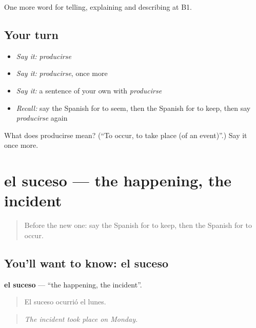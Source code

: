 \begin{grammarlens}[title={What you've built}]
One more word for telling, explaining and describing at B1.
\end{grammarlens}

\subsection*{Your turn}
\begin{itemize}
\raggedright
  \item \emph{Say it:} \emph{producirse}
  \item \emph{Say it:} \emph{producirse}, once more
  \item \emph{Say it:} a sentence of your own with \emph{producirse}
  \item \emph{Recall:} say the Spanish for to seem, then the Spanish for to keep, then say \emph{producirse} again
\end{itemize}

\begin{tcolorbox}[breakable,colback=teal!4,colframe=teal!35!black,title={Before you move on}]
What does producirse mean? (\textquotedblleft{}To occur, to take place (of an event)\textquotedblright{}.) Say it once more.
\end{tcolorbox}
\section[el suceso]{el suceso — the happening, the incident}

\label{lesson:ES-C512-suceso}



\begin{quote}
Before the new one: say the Spanish for to keep, then the Spanish for to occur.
\end{quote}

\subsection*{You'll want to know: el suceso}
\textbf{el suceso} — \textquotedblleft{}the happening, the incident\textquotedblright{}.

\begin{quote}
El suceso ocurrió el lunes.
\end{quote}

\begin{quote}
\emph{The incident took place on Monday.}
\end{quote}

